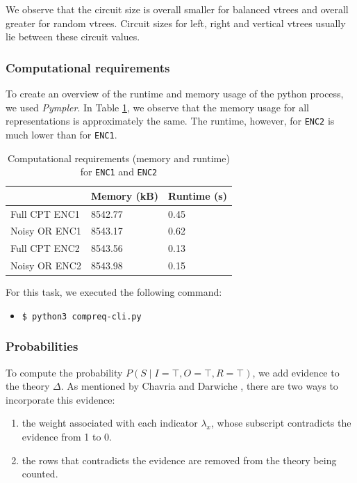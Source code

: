 \documentclass{article}
\begin{document}
We observe that the circuit size is overall smaller for balanced vtrees and overall greater for random vtrees. Circuit sizes for left, right and vertical vtrees usually lie between these circuit values. 

\subsubsection{Computational requirements}
To create an overview of the runtime and memory usage of the python process, we used \textit{Pympler}. In Table \ref{tab:memory_runtime}, we observe that the memory usage for all representations is approximately the same. The runtime, however, for \texttt{ENC2} is much lower than for \texttt{ENC1}.

\begin{table}[h]
\centering
\begin{tabular}{l | l l}
					&	Memory (kB)	&	Runtime (s)	\\\hline
	Full CPT ENC1	&	8542.77		&	0.45			\\
	Noisy OR ENC1	&	8543.17		&	0.62			\\
	Full CPT ENC2	&	8543.56		&	0.13			\\
	Noisy OR ENC2	&	8543.98		&	0.15			\\
\end{tabular}
\caption{Computational requirements (memory and runtime) for \texttt{ENC1} and \texttt{ENC2}}
\label{tab:memory_runtime}
\end{table}

For this task, we executed the following command:
\begin{itemize}
	\item[] \texttt{\$ python3 compreq-cli.py}
\end{itemize}

\subsubsection{Probabilities}
To compute the probability $P(S \mid I=\top, O = \top, R = \top)$, we add evidence to the theory $\Delta$. As mentioned by Chavria and Darwiche \cite{chavira}, there are two ways to incorporate this evidence:
\begin{enumerate}
	\item the weight associated with each indicator $\lambda_x$, whose subscript contradicts the evidence from 1 to 0.
	\item the rows that contradicts the evidence are removed from the theory being counted.
\end{enumerate}
\end{document}
